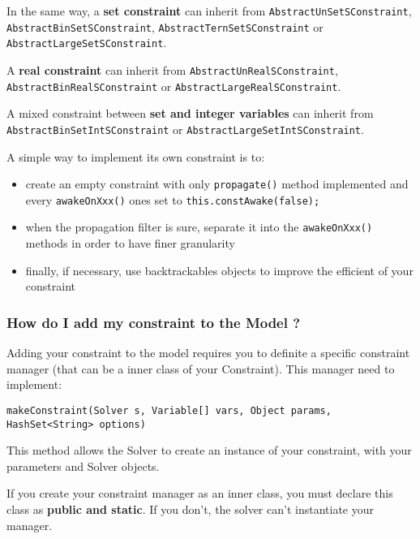 In the same way, a \textbf{set constraint} can inherit from \texttt{AbstractUnSetSConstraint}, \texttt{AbstractBinSetSConstraint}, \texttt{AbstractTernSetSConstraint} or \texttt{AbstractLargeSetSConstraint}.

A \textbf{real constraint} can inherit from \texttt{AbstractUnRealSConstraint}, \texttt{AbstractBinRealSConstraint} or \texttt{AbstractLargeRealSConstraint}.

A mixed constraint between \textbf{set and integer variables} can inherit from \texttt{AbstractBinSetIntSConstraint} or \texttt{AbstractLargeSetIntSConstraint}.

\begin{note}
A simple way to implement its own constraint is to:
\begin{itemize}
	\item create an empty constraint with only \texttt{propagate()} method implemented and every \texttt{awakeOnXxx()} ones set to \texttt{this.constAwake(false);}
	\item when the propagation filter is sure, separate it into the \texttt{awakeOnXxx()} methods in order to have finer granularity
	\item finally, if necessary, use backtrackables objects to improve the efficient of your constraint
\end{itemize}

\end{note}

\subsubsection{How do I add my constraint to the Model ?}\label{advanced:howdoiaddmyconstrainttothemodel}\hypertarget{advanced:howdoiaddmyconstrainttothemodel}{}

Adding your constraint to the model requires you to definite a specific constraint manager (that can be a inner class of your Constraint).
This manager need to implement:
\begin{lstlisting}
makeConstraint(Solver s, Variable[] vars, Object params, HashSet<String> options)
\end{lstlisting}
This method allows the Solver to create an instance of your constraint, with your parameters and Solver objects.

\begin{note}
If you create your constraint manager as an inner class, you must declare this class as \textbf{public and static}.
If you don't, the solver can't instantiate your manager.
\end{note}

